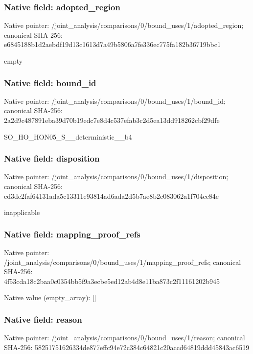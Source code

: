 \documentclass[10pt,a4paper]{article}
\begin{document}
\subsubsection{Native field: adopted\_\allowbreak{}region}
Native pointer: /joint\_\allowbreak{}analysis/comparisons/0/bound\_\allowbreak{}uses/1/adopted\_\allowbreak{}region; canonical SHA-256: e6845188b1d2aebdf19d13c1613d7a49b5806a7fe336ec775fa182b36719bbc1

\begingroup\raggedright\sloppy empty\par\endgroup

\subsubsection{Native field: bound\_\allowbreak{}id}
Native pointer: /joint\_\allowbreak{}analysis/comparisons/0/bound\_\allowbreak{}uses/1/bound\_\allowbreak{}id; canonical SHA-256: 2a2d9c487891eba39d70b19edc7e8d4c537efab3c2d5ea13dd918262cbf29dfe

\begingroup\raggedright\sloppy SO\_\allowbreak{}HO\_\allowbreak{}HON05\_\allowbreak{}S\_\allowbreak{}\_\allowbreak{}deterministic\_\allowbreak{}\_\allowbreak{}b4\par\endgroup

\subsubsection{Native field: disposition}
Native pointer: /joint\_\allowbreak{}analysis/comparisons/0/bound\_\allowbreak{}uses/1/disposition; canonical SHA-256: cd3dc2faf64131ada5c13311e93814ad6ada2d5b7ae8b2c083062a1f704cc84e

\begingroup\raggedright\sloppy inapplicable\par\endgroup

\subsubsection{Native field: mapping\_\allowbreak{}proof\_\allowbreak{}refs}
Native pointer: /joint\_\allowbreak{}analysis/comparisons/0/bound\_\allowbreak{}uses/1/mapping\_\allowbreak{}proof\_\allowbreak{}refs; canonical SHA-256: 4f53cda18c2baa0c0354bb5f9a3ecbe5ed12ab4d8e11ba873c2f11161202b945

Native value (empty\_\allowbreak{}array): []

\subsubsection{Native field: reason}
Native pointer: /joint\_\allowbreak{}analysis/comparisons/0/bound\_\allowbreak{}uses/1/reason; canonical SHA-256: 58251751626334de877effc94e72c384c64821c20accd64819ddd45843ac6519
\end{document}
